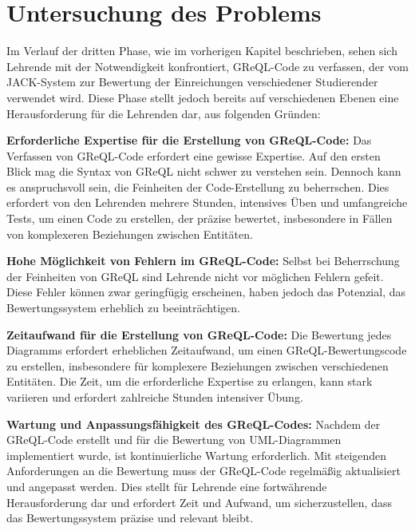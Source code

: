 \section{Untersuchung des Problems}

Im Verlauf der dritten Phase, wie im vorherigen Kapitel beschrieben, sehen sich Lehrende mit der Notwendigkeit konfrontiert, GReQL-Code zu verfassen, der vom JACK-System zur Bewertung der Einreichungen verschiedener Studierender verwendet wird. Diese Phase stellt jedoch bereits auf verschiedenen Ebenen eine Herausforderung für die Lehrenden dar, aus folgenden Gründen:

\vspace{0.5cm}

\textbf{Erforderliche Expertise für die Erstellung von GReQL-Code:}
Das Verfassen von GReQL-Code erfordert eine gewisse Expertise. Auf den ersten Blick mag die Syntax von GReQL nicht schwer zu verstehen sein. Dennoch kann es anspruchsvoll sein, die Feinheiten der Code-Erstellung zu beherrschen. Dies erfordert von den Lehrenden mehrere Stunden, intensives Üben und umfangreiche Tests, um einen Code zu erstellen, der präzise bewertet, insbesondere in Fällen von komplexeren Beziehungen zwischen Entitäten.

\vspace{0.5cm}

\textbf{Hohe Möglichkeit von Fehlern im GReQL-Code:}
Selbst bei Beherrschung der Feinheiten von GReQL sind Lehrende nicht vor möglichen Fehlern gefeit. Diese Fehler können zwar geringfügig erscheinen, haben jedoch das Potenzial, das Bewertungssystem erheblich zu beeinträchtigen.

\vspace{0.5cm}

\textbf{Zeitaufwand für die Erstellung von GReQL-Code:}
Die Bewertung jedes Diagramms erfordert erheblichen Zeitaufwand, um einen GReQL-Bewertungscode zu erstellen, insbesondere für komplexere Beziehungen zwischen verschiedenen Entitäten. Die Zeit, um die erforderliche Expertise zu erlangen, kann stark variieren und erfordert zahlreiche Stunden intensiver Übung.

\vspace{0.5cm}

\textbf{Wartung und Anpassungsfähigkeit des GReQL-Codes:}
Nachdem der GReQL-Code erstellt und für die Bewertung von UML-Diagrammen implementiert wurde, ist kontinuierliche Wartung erforderlich. Mit steigenden Anforderungen an die Bewertung muss der GReQL-Code regelmäßig aktualisiert und angepasst werden. Dies stellt für Lehrende eine fortwährende Herausforderung dar und erfordert Zeit und Aufwand, um sicherzustellen, dass das Bewertungssystem präzise und relevant bleibt.

